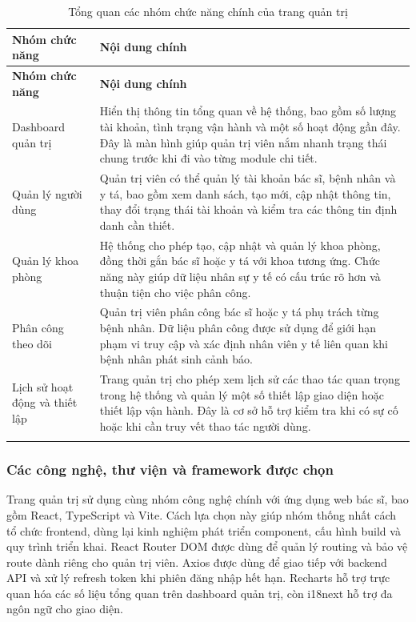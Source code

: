 \begin{center}
\renewcommand{\arraystretch}{1.25}
\begin{longtable}{|L{4.2cm}|L{10.2cm}|}
    \hline
    \textbf{Nhóm chức năng} & \textbf{Nội dung chính} \\
    \hline
    \endfirsthead
    \hline
    \textbf{Nhóm chức năng} & \textbf{Nội dung chính} \\
    \hline
    \endhead

    Dashboard quản trị &
    Hiển thị thông tin tổng quan về hệ thống, bao gồm số lượng tài khoản, tình trạng vận hành và một số hoạt động gần đây. Đây là màn hình giúp quản trị viên nắm nhanh trạng thái chung trước khi đi vào từng module chi tiết. \\
    \hline

    Quản lý người dùng &
    Quản trị viên có thể quản lý tài khoản bác sĩ, bệnh nhân và y tá, bao gồm xem danh sách, tạo mới, cập nhật thông tin, thay đổi trạng thái tài khoản và kiểm tra các thông tin định danh cần thiết. \\
    \hline

    Quản lý khoa phòng &
    Hệ thống cho phép tạo, cập nhật và quản lý khoa phòng, đồng thời gắn bác sĩ hoặc y tá với khoa tương ứng. Chức năng này giúp dữ liệu nhân sự y tế có cấu trúc rõ hơn và thuận tiện cho việc phân công. \\
    \hline

    Phân công theo dõi &
    Quản trị viên phân công bác sĩ hoặc y tá phụ trách từng bệnh nhân. Dữ liệu phân công được sử dụng để giới hạn phạm vi truy cập và xác định nhân viên y tế liên quan khi bệnh nhân phát sinh cảnh báo. \\
    \hline

    Lịch sử hoạt động và thiết lập &
    Trang quản trị cho phép xem lịch sử các thao tác quan trọng trong hệ thống và quản lý một số thiết lập giao diện hoặc thiết lập vận hành. Đây là cơ sở hỗ trợ kiểm tra khi có sự cố hoặc khi cần truy vết thao tác người dùng. \\
    \hline

    \caption{Tổng quan các nhóm chức năng chính của trang quản trị}
    \label{chapter3-table-admin-functions}
\end{longtable}
\end{center}

\subsubsection{Các công nghệ, thư viện và framework được chọn}
\par Trang quản trị sử dụng cùng nhóm công nghệ chính với ứng dụng web bác sĩ, bao gồm React, TypeScript và Vite. Cách lựa chọn này giúp nhóm thống nhất cách tổ chức frontend, dùng lại kinh nghiệm phát triển component, cấu hình build và quy trình triển khai. React Router DOM được dùng để quản lý routing và bảo vệ route dành riêng cho quản trị viên. Axios được dùng để giao tiếp với backend API và xử lý refresh token khi phiên đăng nhập hết hạn. Recharts hỗ trợ trực quan hóa các số liệu tổng quan trên dashboard quản trị, còn i18next hỗ trợ đa ngôn ngữ cho giao diện.

